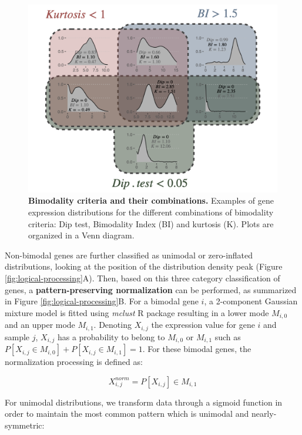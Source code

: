 \documentclass[a4paper,12pt,twoside,onecolumn,openright,final,oldfontcommands]{memoir}
\begin{document}
\begin{figure}

{\centering \includegraphics[width=0.8\linewidth]{fig/bimodality} 

}

\caption[Bimodality criteria and their combinations]{\textbf{Bimodality criteria and their
combinations.} Examples of gene expression distributions for the
different combinations of bimodality criteria: Dip test, Bimodality
Index (BI) and kurtosis (K). Plots are organized in a Venn diagram.}\label{fig:bimodality}
\end{figure}






Non-bimodal genes are further classified as unimodal or zero-inflated
distributions, looking at the position of the distribution density peak
(Figure \ref{fig:logical-processing}A). Then, based on this three
category classification of genes, a \textbf{pattern-preserving
normalization} can be performed, as summarized in Figure
\ref{fig:logical-processing}B. For a bimodal gene \(i\), a 2-component
Gaussian mixture model is fitted using \emph{mclust} R package resulting
in a lower mode \(M_{i,0}\) and an upper mode \(M_{i,1}\). Denoting
\(X_{i,j}\) the expression value for gene \(i\) and sample \(j\),
\(X_{i,j}\) has a probability to belong to \(M_{i,0}\) or \(M_{i,1}\)
such as \(P[X_{i,j} \in M_{i,0}]+P[X_{i,j} \in M_{i,1}]=1\). For these
bimodal genes, the normalization processing is defined as:

\[X_{i,j}^{norm}=P[X_{i,j}] \in M_{i,1}\]

For unimodal distributions, we transform data through a sigmoid function
in order to maintain the most common pattern which is unimodal and
nearly-symmetric:
\end{document}
